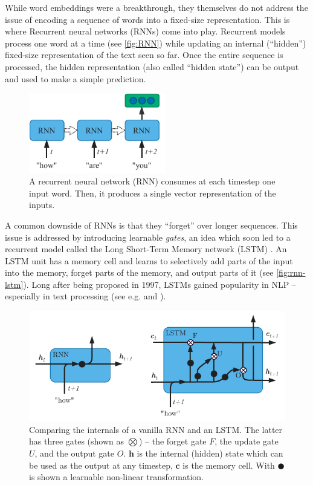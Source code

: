 \documentclass[bsc,frontabs,twoside,singlespacing,parskip,deptreport]{infthesis}
\begin{document}
{{    %
    While word embeddings were a breakthrough, they themselves do not address the issue of encoding a sequence of words into a fixed-size representation. This is where Recurrent neural networks (RNNs) \citep{Rumelhart_1986} come into play.
    Recurrent models process one word at a time (see \autoref{fig:RNN}) while updating an internal (``hidden'') fixed-size representation of the text seen so far.
    Once the entire sequence is processed, the hidden representation (also called ``hidden state'') can be output and used to make a simple prediction.
    \begin{figure}[h!t]
      \centering
      \includegraphics[width=6cm]{graphics/rnn}
      \caption{A recurrent neural network (RNN) consumes at each timestep one input word. Then, it produces a single vector representation of the inputs.}
      \label{fig:RNN}
    \end{figure}
    A common downside of RNNs is that they ``forget'' over longer sequences. This issue is addressed by introducing learnable \textit{gates}, an idea which soon led to a recurrent model called the Long Short-Term Memory network (LSTM) \citep{Hochreiter_Schmidhuber_1997}. An LSTM unit has a memory cell and learns to selectively add parts of the input into the memory, forget parts of the memory, and output parts of it (see \autoref{fig:rnn-lstm}). Long after being proposed in 1997, LSTMs gained popularity in NLP -- especially in text processing (see e.g. \citet{Mikolov_2010} and \citet{Graves_2013}). 
    \begin{figure}[h!t]
      \centering
      \includegraphics[width=13cm]{graphics/rnn-lstm}
      \caption{Comparing the internals of a vanilla RNN and an LSTM. The latter has three gates (shown as $\bigotimes$) -- the forget gate $F$, the update gate $U$, and the output gate $O$. $\bm{h}$ is the internal (hidden) state which can be used as the output at any timestep, $\bm{c}$ is the memory cell. With $\CIRCLE$ is shown a learnable non-linear transformation.}
      \label{fig:rnn-lstm}
    \end{figure}

}}
\end{document}
